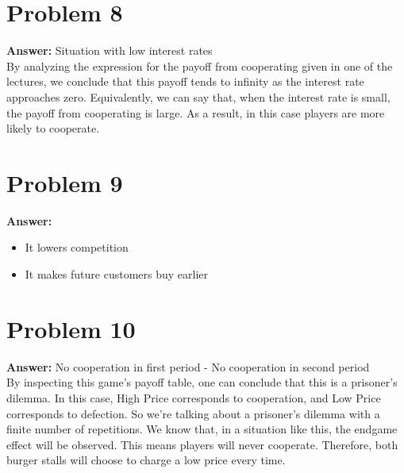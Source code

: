 \documentclass[11pt]{article}
\begin{document}
\section*{Problem 8}
\label{sec:org5052b50}

\textbf{Answer:} Situation with low interest rates\\

By analyzing the expression for the payoff from cooperating given in one of the
lectures, we conclude that this payoff tends to infinity as the interest rate
approaches zero. Equivalently, we can say that, when the interest rate is small,
the payoff from cooperating is large. As a result, in this case players are more
likely to cooperate.
\section*{Problem 9}
\label{sec:orgc7b6cdf}

\textbf{Answer:}
\begin{itemize}
\item It lowers competition
\item It makes future customers buy earlier
\end{itemize}
\section*{Problem 10}
\label{sec:org376d754}

\textbf{Answer:} No cooperation in first period - No cooperation in second period\\

By inspecting this game's payoff table, one can conclude that this is a
prisoner's dilemma. In this case, High Price corresponds to cooperation, and Low
Price corresponds to defection. So we're talking about a prisoner's dilemma with
a finite number of repetitions. We know that, in a situation like this, the
endgame effect will be observed. This means players will never cooperate.
Therefore, both burger stalls will choose to charge a low price every time.
\end{document}

